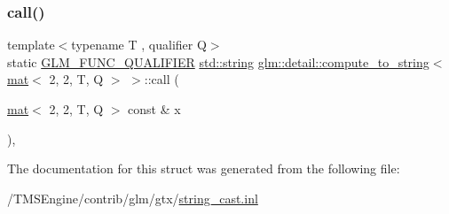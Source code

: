 \subsubsection{\texorpdfstring{call()}{call()}}
{\footnotesize\ttfamily template$<$typename T , qualifier Q$>$ \\
static \hyperlink{setup_8hpp_a33fdea6f91c5f834105f7415e2a64407}{G\+L\+M\+\_\+\+F\+U\+N\+C\+\_\+\+Q\+U\+A\+L\+I\+F\+I\+ER} \hyperlink{_s_d_l__opengl__glext_8h_ae84541b4f3d8e1ea24ec0f466a8c568b}{std\+::string} \hyperlink{structglm_1_1detail_1_1compute__to__string}{glm\+::detail\+::compute\+\_\+to\+\_\+string}$<$ \hyperlink{structglm_1_1mat}{mat}$<$ 2, 2, T, Q $>$ $>$\+::call (\begin{DoxyParamCaption}\item[{\hyperlink{structglm_1_1mat}{mat}$<$ 2, 2, T, Q $>$ const \&}]{x }\end{DoxyParamCaption})\hspace{0.3cm}{\ttfamily [inline]}, {\ttfamily [static]}}



The documentation for this struct was generated from the following file\+:\begin{DoxyCompactItemize}
\item 
/\+T\+M\+S\+Engine/contrib/glm/gtx/\hyperlink{string__cast_8inl}{string\+\_\+cast.\+inl}\end{DoxyCompactItemize}
